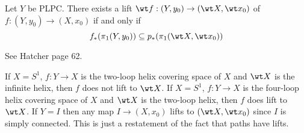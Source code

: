 \begin{prop}
	Let $Y$ be PLPC.
	There exists a lift $\wt f: (Y,y_0) \to (\wt X,\wt x_0)$ of $f: (Y,y_0) \to (X,x_0)$ if and only if
	\[f_*(\pi_1(Y,y_0)) \subseteq p_*(\pi_1(\wt X,\wt x_0))\]
\end{prop}

\begin{prop}
	See Hatcher page 62.
\end{prop}

\begin{exam}
	\leavevmode
	\begin{enum}
		\io If $X=S^1$, $f: Y \to X$ is the two-loop helix covering space of $X$ and $\wt X$ is the infinite helix, then $f$ does not lift to $\wt X$.
		\io If $X=S^1$, $f: Y \to X$ is the four-loop helix covering space of $X$ and $\wt X$ is the two-loop helix, then $f$ does lift to $\wt X$.
		\io If $Y=I$ then any map $I \to (X,x_0)$ lifts to $(\wt X,\wt x_0)$ since $I$ is simply connected.
		This is just a restatement of the fact that paths have lifts.
	\end{enum}
\end{exam}
